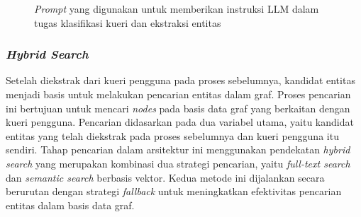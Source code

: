 \begin{figure}[H]
	\centering
	\caption{\textit{Prompt} yang digunakan untuk memberikan instruksi LLM dalam tugas klasifikasi kueri dan ekstraksi entitas}
	\label{fig:prompt-query-classification-entity-extraction}
\end{figure}

\subsubsection{\textit{Hybrid Search}}
Setelah diekstrak dari kueri pengguna pada proses sebelumnya, kandidat entitas menjadi basis untuk melakukan pencarian entitas dalam graf.
Proses pencarian ini bertujuan untuk mencari \textit{nodes} pada basis data graf yang berkaitan dengan kueri pengguna.
Pencarian didasarkan pada dua variabel utama, yaitu kandidat entitas yang telah diekstrak pada proses sebelumnya dan kueri pengguna itu sendiri.
Tahap pencarian dalam arsitektur ini menggunakan pendekatan \textit{hybrid search} yang merupakan kombinasi dua strategi pencarian, yaitu \textit{full-text search} dan \textit{semantic search} berbasis vektor.
Kedua metode ini dijalankan secara berurutan dengan strategi \textit{fallback} untuk meningkatkan efektivitas pencarian entitas dalam basis data graf.

